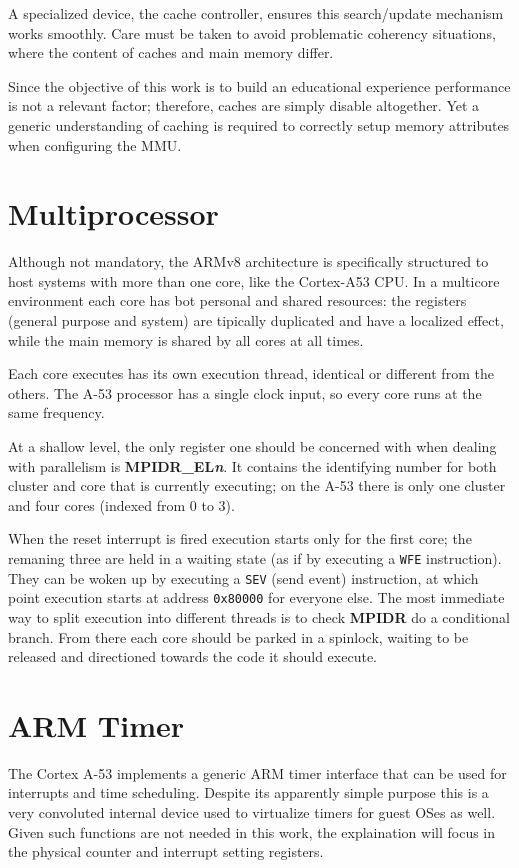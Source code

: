 \documentclass[12pt,a4paper,openright,twoside]{report}
\begin{document}
A specialized device, the cache controller, ensures this search/update mechanism
works smoothly. Care must be taken to avoid problematic coherency situations, where
the content of caches and main memory differ.

Since the objective of this work is to build an educational experience performance
is not a relevant factor; therefore, caches are simply disable altogether.
Yet a generic understanding of caching is required to correctly setup memory
attributes when configuring the MMU.

\section{Multiprocessor}
Although not mandatory, the ARMv8 architecture is specifically structured to 
host systems with more than one core, like the Cortex-A53 CPU.
In a multicore environment each core has bot personal and shared resources:
the registers (general purpose and system) are tipically duplicated and have a
localized effect, while the main memory is shared by all cores at all times.

Each core executes has its own execution thread, identical or different from 
the others. The A-53 processor has a single clock input, so every core runs at
the same frequency.

At a shallow level, the only register one should be concerned with when dealing 
with parallelism is \textbf{MPIDR\_EL\textit{n}}. It contains the identifying number
for both cluster and core that is currently executing; on the A-53 there is only
one cluster and four cores (indexed from 0 to 3).

When the reset interrupt is fired execution starts only for the first core; the
remaning three are held in a waiting state (as if by executing a {\tt WFE} instruction).
They can be woken up by executing a {\tt SEV} (send event) instruction, at which
point execution starts at address {\tt 0x80000} for everyone else.
The most immediate way to split execution into different threads is to check 
\textbf{MPIDR} do a conditional branch. From there each core should be parked in 
a spinlock, waiting to be released and directioned towards the code it should
execute.

\section{ARM Timer}
The Cortex A-53 implements a generic ARM timer interface that can be used for interrupts
and time scheduling. Despite its apparently simple purpose this is a very convoluted
internal device used to virtualize timers for guest OSes as well.
Given such functions are not needed in this work, the explaination will focus 
in the physical counter and interrupt setting registers.
\end{document}
